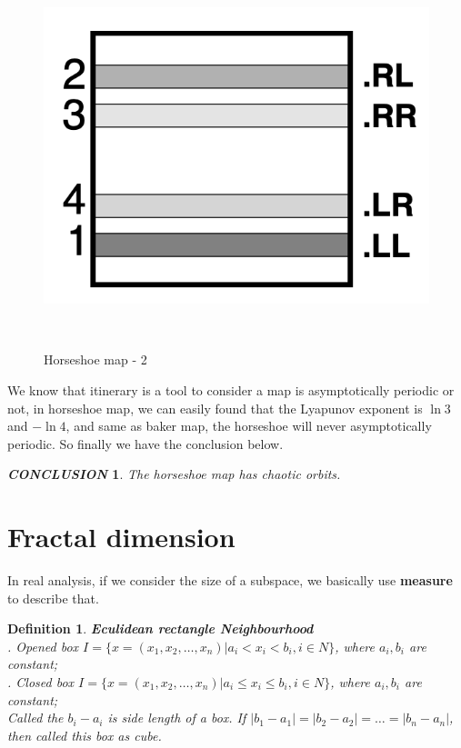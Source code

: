 \documentclass[12pt]{article}
\theoremstyle{plain}
\newtheorem{definition}{{\color{red}\textbf{Definition}}}[section]
\newtheorem{conclusion}{\textit{\textbf{CONCLUSION}}}[section]
\begin{document}
\begin{figure}[H]
\begin{minipage}[c][0.24\width]{
   0.24\textwidth}
\end{minipage}
\begin{minipage}[c][0.24\width]{
   0.24\textwidth}
   \centering
   \includegraphics[width=1\textwidth]{figure/section5/horseshoe-3-2.png}
\end{minipage}
\\[6ex]\caption{Horseshoe map - 2}\label{horseshoe-map-2}
\end{figure}


We know that itinerary is a tool to consider a map is asymptotically periodic or not, in horseshoe map, we can easily found that the Lyapunov exponent is $\ln 3$ and $- \ln 4$, and same as baker map, the horseshoe will never asymptotically periodic. So finally we have the conclusion below.

\begin{conclusion} The horseshoe map has chaotic orbits.
\end{conclusion}






\newpage
\section{Fractal dimension}

In real analysis, if we consider the size of a subspace, we basically use \textbf{measure} to describe that.

\begin{definition}\textbf{Eculidean rectangle Neighbourhood}
\\. Opened box $I = \{x = (x_1, x_2, \ldots ,x_n) | a_i < x_i < b_i, i \in N\}$, where $a_i, b_i$ are constant;
\\. Closed box $I = \{x = (x_1, x_2, \ldots ,x_n) | a_i \leq x_i \leq b_i, i \in N\}$, where $a_i, b_i$ are constant;
\\\noindent Called the $b_i - a_i$ is side length of a box. If $|b_1 - a_1| = |b_2 - a_2| = \ldots = |b_n - a_n|$, then called this box as cube.
\end{definition}
\end{document}
